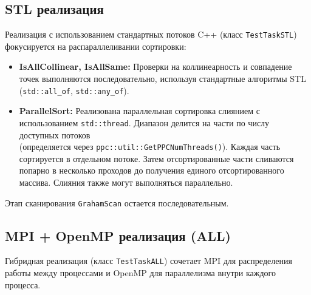 \documentclass[12pt]{article}
\begin{document}
\subsection{STL реализация}
Реализация с использованием стандартных потоков C++ (класс \texttt{TestTaskSTL}) фокусируется на распараллеливании сортировки:
\begin{itemize}
    \item \textbf{IsAllCollinear, IsAllSame:} Проверки на коллинеарность и совпадение точек выполняются последовательно, используя стандартные алгоритмы STL (\texttt{std::all\_of}, \texttt{std::any\_of}).
    \item \textbf{ParallelSort:} Реализована параллельная сортировка слиянием с использованием \texttt{std::thread}. Диапазон делится на части по числу доступных потоков \\(определяется через \texttt{ppc::util::GetPPCNumThreads()}). Каждая часть сортируется в отдельном потоке. Затем отсортированные части сливаются попарно в несколько проходов до получения единого отсортированного массива. Слияния также могут выполняться параллельно.
\end{itemize}
Этап сканирования \texttt{GrahamScan} остается последовательным.

\subsection{MPI + OpenMP реализация (ALL)}
Гибридная реализация (класс \texttt{TestTaskALL}) сочетает MPI для распределения работы между процессами и OpenMP для параллелизма внутри каждого процесса.
\end{document}
